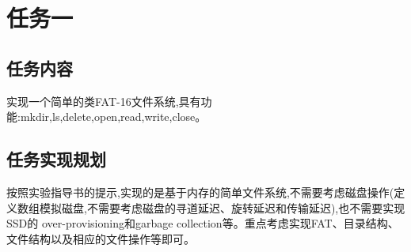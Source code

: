 \section{任务一}
\subsection{任务内容}
实现一个简单的类FAT-16文件系统,具有功能:mkdir,ls,delete,open,read,write,close。

\subsection{任务实现规划}
按照实验指导书的提示,实现的是基于内存的简单文件系统,不需要考虑磁盘操作(定义数组模拟磁盘,不需要考虑磁盘的寻道延迟、旋转延迟和传输延迟),也不需要实现SSD的
over-provisioning和garbage collection等。重点考虑实现FAT、目录结构、文件结构以及相应的文件操作等即可。














